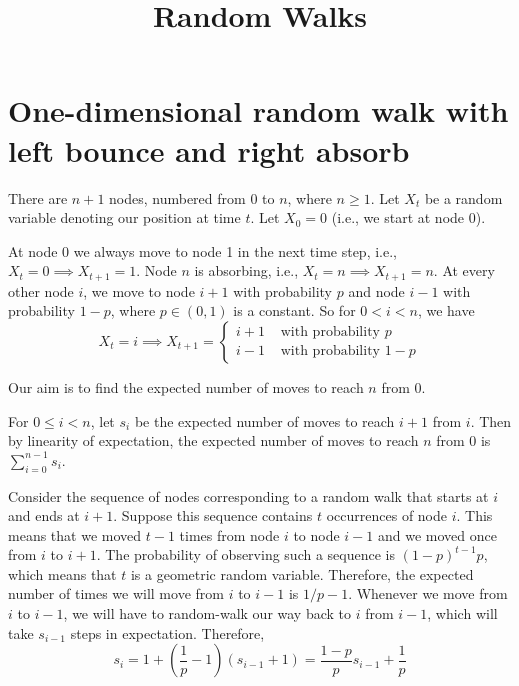 

\title{Random Walks}



\maketitle
\initMinimal{}

\section{One-dimensional random walk with left bounce and right absorb}

There are $n+1$ nodes, numbered from $0$ to $n$, where $n \ge 1$.
Let $X_t$ be a random variable denoting our position at time $t$.
Let $X_0 = 0$ (i.e., we start at node 0).

At node 0 we always move to node 1 in the next time step,
i.e., $X_t = 0 \implies X_{t+1} = 1$.
Node $n$ is absorbing, i.e., $X_t = n \implies X_{t+1} = n$.
At every other node $i$, we move to node $i+1$ with probability $p$
and node $i-1$ with probability $1-p$, where $p \in (0, 1)$ is a constant.
So for $0 < i < n$, we have
\[ X_t = i \implies X_{t+1} = \begin{cases} i+1 & \textrm{ with probability } p
\\ i-1 & \textrm{ with probability } 1-p \end{cases} \]

Our aim is to find the expected number of moves to reach $n$ from $0$.

For $0 \le i < n$, let $s_i$ be the expected number of moves to reach $i+1$ from $i$.
Then by linearity of expectation, the expected number of moves to reach $n$ from $0$
is $\sum_{i=0}^{n-1} s_i$.

Consider the sequence of nodes corresponding to a random walk that
starts at $i$ and ends at $i+1$.
Suppose this sequence contains $t$ occurrences of node $i$.
This means that we moved $t-1$ times from node $i$ to node $i-1$
and we moved once from $i$ to $i+1$.
The probability of observing such a sequence is $(1-p)^{t-1}p$,
which means that $t$ is a geometric random variable.
Therefore, the expected number of times we will move from $i$ to $i-1$ is $1/p - 1$.
Whenever we move from $i$ to $i-1$, we will have to random-walk our way back to $i$ from $i-1$,
which will take $s_{i-1}$ steps in expectation.
Therefore,
\[ s_i = 1 + \left(\frac{1}{p}-1\right)(s_{i-1} + 1) = \frac{1-p}{p}s_{i-1} + \frac{1}{p} \]

